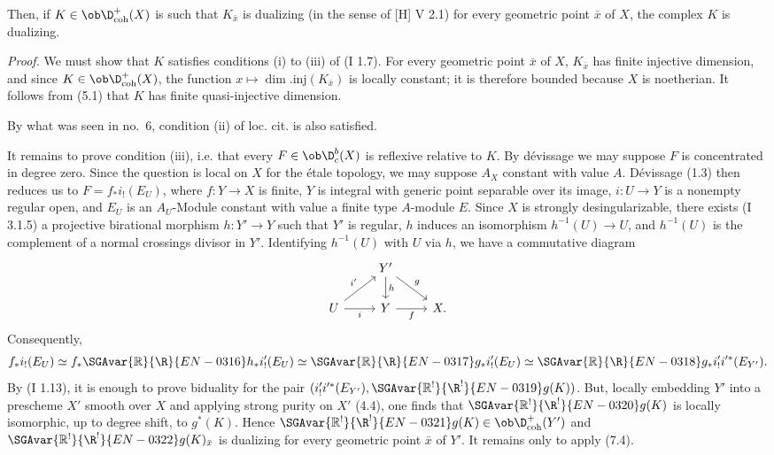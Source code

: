 Then, if $K\in\ob\D^{+}_{\mathrm{coh}}(X)$ is such that $K_{\bar{x}}$ is dualizing (in the sense of [H] V 2.1) for every geometric point $\bar{x}$ of $X$, the complex $K$ is dualizing.

\emph{Proof.} We must show that $K$ satisfies conditions (i) to (iii) of (I 1.7). For every geometric point $\bar{x}$ of $X$, $K_{\bar{x}}$ has finite injective dimension, and since $K\in\ob\D^{+}_{\mathrm{coh}}(X)$, the function $x\mapsto\dim.\mathrm{inj}(K_{\bar{x}})$ is locally constant; it is therefore bounded because $X$ is noetherian. It follows from (5.1) that $K$ has finite quasi-injective dimension.

By what was seen in no.~6, condition (ii) of loc. cit. is also satisfied.

It remains to prove condition (iii), i.e. that every $F\in\ob\D_c^b(X)$ is reflexive relative to $K$. By dévissage we may suppose $F$ is concentrated in degree zero. Since the question is local on $X$ for the étale topology, we may suppose $A_X$ constant with value $A$. Dévissage (1.3) then reduces us to $F=f_*i_!(E_U)$, where $f:Y\to X$ is finite, $Y$ is integral with generic point separable over its image, $i:U\to Y$ is a nonempty regular open, and $E_U$ is an $A_U$-Module constant with value a finite type $A$-module $E$. Since $X$ is strongly desingularizable, there exists (I 3.1.5) a projective birational morphism $h:Y'\to Y$ such that $Y'$ is regular, $h$ induces an isomorphism $h^{-1}(U)\to U$, and $h^{-1}(U)$ is the complement of a normal crossings divisor in $Y'$. Identifying $h^{-1}(U)$ with $U$ via $h$, we have a commutative diagram
\[
\begin{tikzcd}
& Y' \arrow[d,"h"] \arrow[dr,"g"] & \\
U \arrow[ur,"i'"] \arrow[r,"i"'] & Y \arrow[r,"f"'] & X.
\end{tikzcd}
\]
Consequently,
\[
        f_*i_!(E_U)\simeq f_*\SGAvar{\mathbb{R}}{\R}{EN-0316} h_* i'_!(E_U)\simeq \SGAvar{\mathbb{R}}{\R}{EN-0317} g_* i'_!(E_U)\simeq \SGAvar{\mathbb{R}}{\R}{EN-0318} g_* i'_! i'^*(E_{Y'}).
\]
By (I 1.13), it is enough to prove biduality for the pair $(i'_!i'^*(E_{Y'}),\SGAvar{\mathbb{R}^!}{\R^!}{EN-0319}g(K))$. But, locally embedding $Y'$ into a prescheme $X'$ smooth over $X$ and applying strong purity on $X'$ (4.4), one finds that $\SGAvar{\mathbb{R}^!}{\R^!}{EN-0320}g(K)$ is locally isomorphic, up to degree shift, to $g^*(K)$. Hence $\SGAvar{\mathbb{R}^!}{\R^!}{EN-0321}g(K)\in\ob\D^{+}_{\mathrm{coh}}(Y')$ and $\SGAvar{\mathbb{R}^!}{\R^!}{EN-0322}g(K)_{\bar{x}}$ is dualizing for every geometric point $\bar{x}$ of $Y'$. It remains only to apply (7.4).


